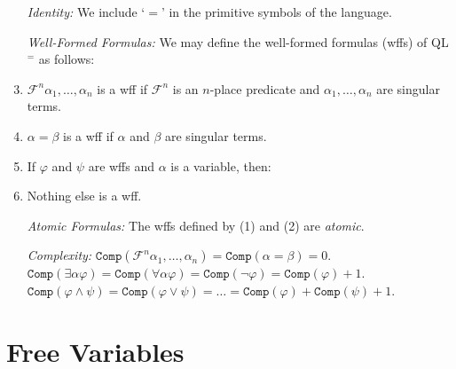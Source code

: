 \documentclass[a4paper, 11pt]{article} %
\newcommand{\F}{\mathcal{F}}
\newcommand{\comp}{\texttt{Comp}}
\begin{document}
\begin{enumerate}
  \item[\it Identity:] We include `$=$' in the primitive symbols of the language.
  \item[\it Well-Formed Formulas:] We may define the well-formed formulas (wffs) of QL$^=$ as follows:
  \item $\mathcal{F}^n\alpha_1,\ldots,\alpha_n$ is a wff if $\mathcal{F}^n$ is an $n$-place predicate and $\alpha_1,\ldots,\alpha_n$ are singular terms.
  \item $\alpha=\beta$ is a wff if $\alpha$ and $\beta$ are singular terms.
  \item If $\varphi$ and $\psi$ are wffs and $\alpha$ is a variable, then:
    \begin{enumerate}
    \end{enumerate}
  \vspace{-.2in}
  \item Nothing else is a wff.
  \vspace{.1in}
  \item[\it Atomic Formulas:] The wffs defined by (1) and (2) are \textit{atomic}.
  \item[\it Complexity:] $\comp(\F^n\alpha_1,\ldots,\alpha_n)=\comp(\alpha=\beta)=0$.\\
    $\comp(\exists\alpha\varphi)=\comp(\forall\alpha\varphi)=\comp(\neg\varphi)=\comp(\varphi)+1$.\\
    $\comp(\varphi\wedge\psi)=\comp(\varphi\vee\psi)=\ldots=\comp(\varphi)+\comp(\psi)+1$.\\
\end{enumerate}





\section*{Free Variables}
\end{document}
